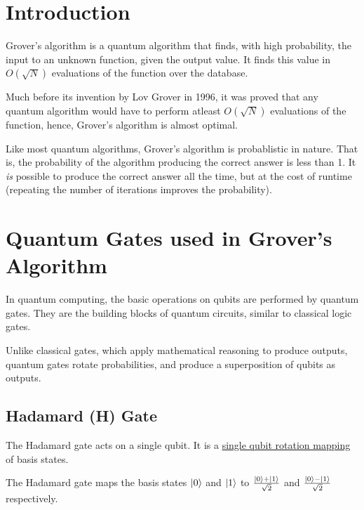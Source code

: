 \documentclass[a4paper]{article}
\begin{document}
\tableofcontents
\pagebreak

\section{Introduction}

Grover's algorithm is a quantum algorithm that finds, with high probability,
the input to an unknown function, given the output value. It finds this value
in $ O(\sqrt{N}) $ evaluations of the function over the database.
\\
\par

Much before its invention by Lov Grover in 1996, it was proved that any quantum
algorithm would have to perform atleast $O(\sqrt{N})$ evaluations of the
function, hence, Grover's algorithm is almost optimal.
\\
\par
Like most quantum algorithms, Grover's algorithm is probablistic in nature.
That is, the probability of the algorithm producing the correct answer is less
than 1.  It \textit{is} possible to produce the correct answer all the time,
but at the cost of runtime (repeating the number of iterations improves the
probability).

\pagebreak


\section{Quantum Gates used in Grover's Algorithm}

In quantum computing, the basic operations on qubits are performed by quantum gates.
They are the building blocks of quantum circuits, similar to classical logic gates.
\\
\par
Unlike classical gates, which apply mathematical reasoning to produce outputs, 
quantum gates rotate probabilities, and produce a superposition of qubits as outputs.

\subsection{ Hadamard (H) Gate }
The Hadamard gate acts on a single qubit. It is a \underline{single qubit
rotation mapping} of basis states.
\\
\par
The Hadamard gate maps the basis states $\ket{0}$ and $\ket{1}$ to 
$ \frac{\ket{0} + \ket{1}}{\sqrt2}$ and $ \frac{\ket{0} - \ket{1}}{\sqrt2}$ 
respectively.
\end{document}
